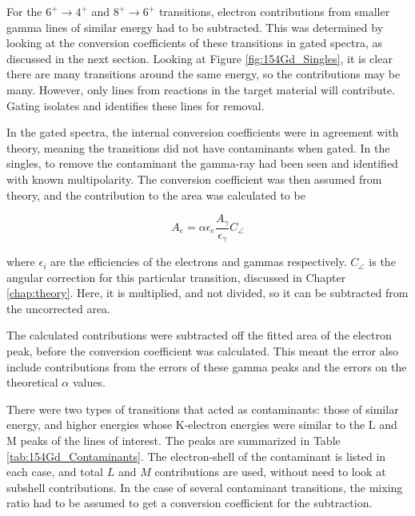 \afterpage{\clearpage}

For the $6^+\rightarrow 4^+$ and $8^+\rightarrow 6^+$ transitions, electron contributions from smaller gamma lines of similar energy had to be subtracted. This was determined by looking at the conversion coefficients of these transitions in gated spectra, as discussed in the next section. Looking at Figure \ref{fig:154Gd_Singles}, it is clear there are many transitions around the same energy, so the contributions may be many. However, only lines from reactions in the target material will contribute. Gating isolates and identifies these lines for removal.

In the gated spectra, the internal conversion coefficients were in agreement with theory, meaning the transitions did not have contaminants when gated. In the singles, to remove the contaminant the gamma-ray had been seen and identified with known multipolarity. The conversion coefficient was then assumed from theory, and the contribution to the area was calculated to be

\begin{equation}
    \label{eq:ICC_Subtract}
    A_{e} = \alpha \epsilon_{e} \frac{A_{\gamma}}{\epsilon_{\gamma}} C_{\angle}
\end{equation}

where $\epsilon_{i}$ are the efficiencies of the electrons and gammas respectively. $C_{\angle}$ is the angular correction for this particular transition, discussed in Chapter \ref{chap:theory}. Here, it is multiplied, and not divided, so it can be subtracted from the uncorrected area.

The calculated contributions were subtracted off the fitted area of the electron peak, before the conversion coefficient was calculated. This meant the error also include contributions from the errors of these gamma peaks and the errors on the theoretical $\alpha$ values. 

There were two types of transitions that acted as contaminants: those of similar energy, and higher energies whose K-electron energies were similar to the L and M peaks of the lines of interest. The peaks are summarized in Table \ref{tab:154Gd_Contaminants}. The electron-shell of the contaminant is listed in each case, and total $L$ and $M$ contributions are used, without need to look at subshell contributions.  In the case of several contaminant transitions, the mixing ratio had to be assumed to get a conversion coefficient for the subtraction.

